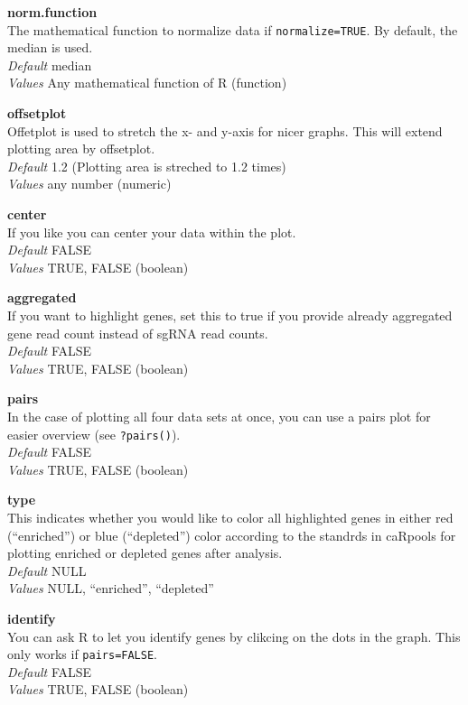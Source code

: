 \documentclass[]{article}
\begin{document}
\textbf{norm.function}\\
The mathematical function to normalize data if \texttt{normalize=TRUE}.
By default, the median is used.\\
\emph{Default} median\\
\emph{Values} Any mathematical function of R (function)

\textbf{offsetplot}\\
Offetplot is used to stretch the x- and y-axis for nicer graphs. This
will extend plotting area by offsetplot.\\
\emph{Default} 1.2 (Plotting area is streched to 1.2 times)\\
\emph{Values} any number (numeric)

\textbf{center}\\
If you like you can center your data within the plot.\\
\emph{Default} FALSE\\
\emph{Values} TRUE, FALSE (boolean)

\textbf{aggregated}\\
If you want to highlight genes, set this to true if you provide already
aggregated gene read count instead of sgRNA read counts.\\
\emph{Default} FALSE\\
\emph{Values} TRUE, FALSE (boolean)

\textbf{pairs}\\
In the case of plotting all four data sets at once, you can use a pairs
plot for easier overview (see \texttt{?pairs()}).\\
\emph{Default} FALSE\\
\emph{Values} TRUE, FALSE (boolean)

\textbf{type}\\
This indicates whether you would like to color all highlighted genes in
either red (``enriched'') or blue (``depleted'') color according to the
standrds in caRpools for plotting enriched or depleted genes after
analysis.\\
\emph{Default} NULL\\
\emph{Values} NULL, ``enriched'', ``depleted''

\textbf{identify}\\
You can ask R to let you identify genes by clikcing on the dots in the
graph. This only works if \texttt{pairs=FALSE}.\\
\emph{Default} FALSE\\
\emph{Values} TRUE, FALSE (boolean)
\end{document}
